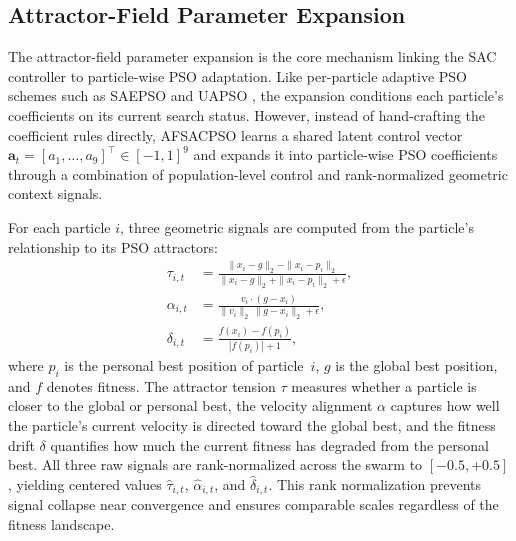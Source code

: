 \documentclass[final,5p,times]{elsarticle}
\begin{document}
\subsection{Attractor-Field Parameter Expansion}
The attractor-field parameter expansion is the core mechanism linking the SAC controller to particle-wise PSO adaptation.
Like per-particle adaptive PSO schemes such as SAEPSO and UAPSO \cite{Liu2025A, Isiet2019Selfadapting}, the expansion conditions each particle's coefficients on its current search status.
However, instead of hand-crafting the coefficient rules directly, AFSACPSO learns a shared latent control vector $\mathbf{a}_t = [a_1,\dots,a_9]^\top \in [-1,1]^9$ and expands it into particle-wise PSO coefficients through a combination of population-level control and rank-normalized geometric context signals.

For each particle $i$, three geometric signals are computed from the particle's relationship to its PSO attractors:
\begin{equation}
\begin{aligned}
\tau_{i,t} &= \frac{\|x_i - g\|_2 - \|x_i - p_i\|_2}{\|x_i - g\|_2 + \|x_i - p_i\|_2 + \epsilon}, \\
\alpha_{i,t} &= \frac{v_i \cdot (g - x_i)}{\|v_i\|_2 \, \|g - x_i\|_2 + \epsilon}, \\
\delta_{i,t} &= \frac{f(x_i) - f(p_i)}{|f(p_i)| + 1},
\end{aligned}
\label{eq:rank_residual_context}
\end{equation}
where $p_i$ is the personal best position of particle~$i$, $g$ is the global best position, and $f$ denotes fitness.
The attractor tension $\tau$ measures whether a particle is closer to the global or personal best, the velocity alignment $\alpha$ captures how well the particle's current velocity is directed toward the global best, and the fitness drift $\delta$ quantifies how much the current fitness has degraded from the personal best.
All three raw signals are rank-normalized across the swarm to $[-0.5, +0.5]$, yielding centered values $\hat{\tau}_{i,t}$, $\hat{\alpha}_{i,t}$, and $\hat{\delta}_{i,t}$.
This rank normalization prevents signal collapse near convergence and ensures comparable scales regardless of the fitness landscape.
\end{document}
